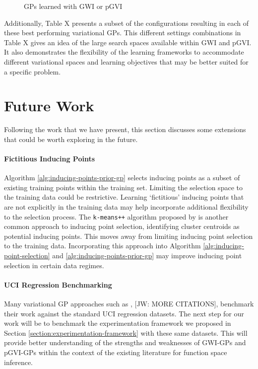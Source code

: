 \documentclass{article}
\def\code#1{\texttt{#1}}
\newcommand{\jw}[1]{{\color{gray} [JW: #1]}}
\numberwithin{equation}{section}
\begin{document}
\begin{figure}[h!]
\begin{minipage}{.49\textwidth}
\end{minipage}%
\label{toy-curves-gps}
\caption{GPs learned with GWI or pGVI}
\end{figure}

Additionally, Table X presents a subset of the configurations resulting in each of these best performing variational GPs. 
This different settings combinations in Table X gives an idea of the large search spaces available within GWI and pGVI. 
It also demonstrates the flexibility of the learning frameworks to accommodate different variational spaces and learning objectives that may be better suited for a specific problem. 

\newpage
\section{Future Work}\label{section:future-work}
Following the work that we have present, this section discusses some extensions that could be worth exploring in the future.

\paragraph{Fictitious Inducing Points} Algorithm \ref{alg:inducing-points-prior-gp} selects inducing points as a subset of existing training points within the training set.
Limiting the selection space to the training data could be restrictive. 
Learning `fictitious' inducing points that are not explicitly in the training data may help incorporate additional flexibility to the selection process.
The \code{k-means++} algorithm proposed by \cite{arthur2007k} is another common approach to inducing point selection, identifying cluster centroids as potential inducing points.
This moves away from limiting inducing point selection to the training data.
Incorporating this approach into Algorithm \ref{alg:inducing-point-selection} and \ref{alg:inducing-points-prior-gp} may improve inducing point selection in certain data regimes.

\paragraph{UCI Regression Benchmarking} 
Many variational GP approaches such as \cite{wild2022generalized}, \jw{MORE CITATIONS}, benchmark their work against the standard UCI regression datasets. 
The next step for our work will be to benchmark the experimentation framework we proposed in Section \ref{section:experimentation-framework} with these same datasets.
This will provide better understanding of the strengths and weaknesses of GWI-GPs and pGVI-GPs within the context of the existing literature for function space inference.
\end{document}
